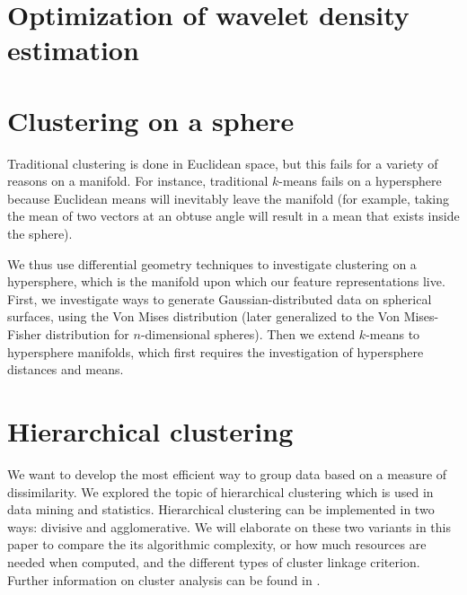 \documentclass{article}
\begin{document}
\part{Optimization of wavelet density estimation}
  
  

\part{Clustering on a sphere}

  Traditional clustering is done in Euclidean space, but this fails for a variety of reasons on a manifold. For instance, traditional $k$-means fails on a hypersphere because Euclidean means will inevitably leave the manifold (for example, taking the mean of two vectors at an obtuse angle will result in a mean that exists inside the sphere).

  We thus use differential geometry techniques to investigate clustering on a hypersphere, which is the manifold upon which our feature representations live. First, we investigate ways to generate Gaussian-distributed data on spherical surfaces, using the Von Mises distribution (later generalized to the Von Mises-Fisher distribution for $n$-dimensional spheres). Then we extend $k$-means to hypersphere manifolds, which first requires the investigation of hypersphere distances and means.

  
  
  
  

\part{Hierarchical clustering}

  We want to develop the most efficient way to group data
  based on a measure of dissimilarity. We explored the topic of
  hierarchical clustering which is used in data mining and statistics.  Hierarchical clustering can be implemented in two
  ways: divisive and agglomerative. We will elaborate on these two variants
  in this paper to compare the its algorithmic complexity, or how much
  resources are needed when computed, and the different types of cluster
  linkage criterion. Further information on cluster analysis can be
  found in  \cite{ClusterAnalysis}.

  
  
  
  
\end{document}
